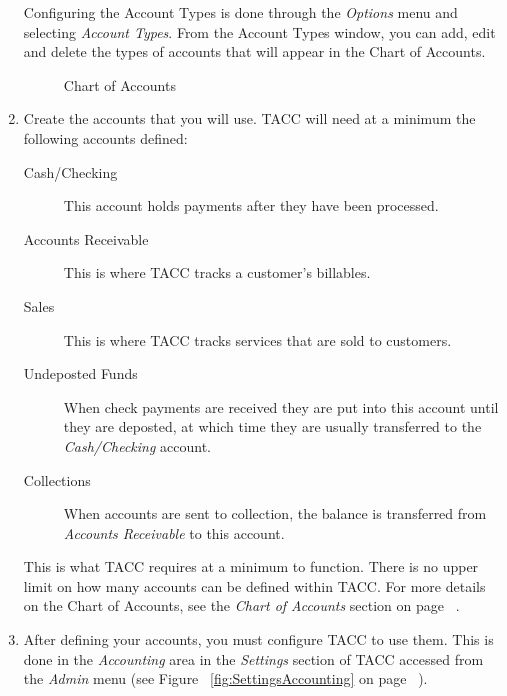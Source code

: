 \begin{enumerate}
\label{QuickStartAccountTypes}
Configuring the Account Types is done through the \emph{Options} menu
and selecting \emph{Account Types}.  From the Account Types window, you
can add, edit and delete the types of accounts that will appear in the
Chart of Accounts.
\begin{figure}[hbtp]
\caption{ \label{fig:ChartOfAccounts} Chart of Accounts}
\end{figure}
\item Create the accounts that you will use.  TACC will need at a
minimum the following accounts defined:
\begin{description}
\item[Cash/Checking] This account holds payments after they have been
processed.
\item[Accounts Receivable] This is where TACC tracks a customer's
billables.
\item[Sales] This is where TACC tracks services that are sold to customers.
\item[Undeposted Funds] When check payments are received they are put
into this account until they are deposted, at which time they are
usually transferred to the \emph{Cash/Checking} account.
\item[Collections] When accounts are sent to collection, the balance is
transferred from \emph{Accounts Receivable} to this account.
\end{description}
This is what TACC requires at a minimum to function.  There is no upper
limit on how many accounts can be defined within TACC.  For more details
on the Chart of Accounts, see the \emph{Chart of Accounts} section on
page ~\pageref{Chart of Accounts}.
\item After defining your accounts, you must configure TACC to use them.
This is done in the \emph{Accounting} area in the \emph{Settings}
section of TACC accessed from the \emph{Admin} menu (see Figure
~\ref{fig:SettingsAccounting} on page ~\pageref{fig:SettingsAccounting}).
\begin{figure}[hbtp]

\end{figure}
\end{enumerate}

